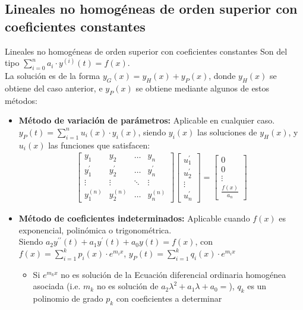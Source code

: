 \documentclass[a4paper, twoside]{article}
\numberwithin{equation}{section}
\numberwithin{figure}{section}
\numberwithin{table}{section}
\begin{document}
\subsection{Lineales no homogéneas de orden superior con coeficientes constantes}
\begin{definicion*}{Lineales no homogéneas de orden superior con coeficientes constantes}
	Son del tipo $\sum_{i=0}^n a_i \cdot y^{(i)}(t)=f(x)$.\\
	
	La solución es de la forma $y_G(x)=y_H(x)+y_P(x)$, donde $y_H(x)$ se obtiene del caso anterior, e $y_P(x)$ se obtiene mediante algunos de estos métodos:
	\begin{itemize}
		\item \textbf{Método de variación de parámetros:} Aplicable en cualquier caso.\\
		$y_P(t)=\sum_{i=1}^n u_i(x) \cdot y_i(x)$, siendo $y_i(x)$ las soluciones de $y_H(x)$, y $u_i(x)$ las funciones que satisfacen:
		\begin{align}
			\begin{bmatrix}
				{y_1} & {y_2} & {\ldots} & {y_n} \\
				{y^\prime_1} & {y^\prime_2} & {\ldots} & {y^\prime_n} \\
				{\vdots} & {\vdots} & {\ddots} & {\vdots} \\
				{y^{(n)}_1} & {y^{(n)}_2} & {\ldots} & {y^{(n)}_n}
			\end{bmatrix}
			\begin{bmatrix}
				{u^\prime_1} \\
				{u^\prime_2} \\
				{\vdots} \\
				{u^\prime_n}
			\end{bmatrix} =
			\begin{bmatrix}
				{0} \\
				{0} \\
				{\vdots} \\
				{\frac{f(x)}{a_n}}
			\end{bmatrix}
		\end{align}
		\item \textbf{Método de coeficientes indeterminados:} Aplicable cuando $f(x)$ es exponencial, polinómica o trigonométrica.\\
		Siendo $a_2y^{\prime\prime}(t)+a_1y^\prime(t)+a_0y(t)=f(x)$, con $f(x)=\sum_{i=1}^k p_i(x) \cdot e^{m_i x}$, $y_P(t)=\sum_{i=1}^k q_i(x) \cdot e^{m_i x}$
		\begin{itemize}
			\item Si $e^{m_k x}$ no es solución de la Ecuación diferencial ordinaria homogénea asociada (i.e. $m_k$ no es solución de $a_2 \lambda^2+a_1\lambda+a_0=$), $q_k$ es un polinomio de grado $p_k$ con coeficientes a determinar

\end{itemize}
\end{itemize}
\end{definicion*}
\end{document}

